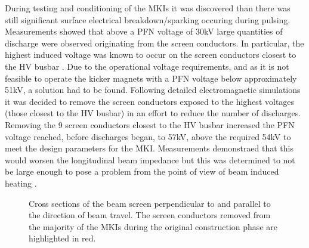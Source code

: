 During testing and conditioning of the MKIs it was discovered than there was still significant surface electrical breakdown/sparking occuring during pulsing. Measurements showed that above a PFN voltage of 30kV large quantities of discharge were observed originating from the screen conductors. In particular, the highest induced voltage was known to occur on the screen conductors closest to the HV busbar \cite{Barnes:improvBeamScreen}. Due to the operational voltage requirements, and as it is not feasible to operate the kicker magnets with a PFN voltage below approximately 51kV, a solution had to be found. Following detailed electromagnetic simulations it was decided to remove the screen conductors exposed to the highest voltages (those closest to the HV busbar) in an effort to reduce the number of discharges. Removing the 9 screen conductors closest to the HV busbar increased the PFN voltage reached, before discharges began, to 57kV, above the required 54kV to meet the design parameters for the MKI. Measurements demonstraed that this would worsen the longitudinal beam impedance but this was determined to not be large enough to pose a problem from the point of view of beam induced heating \cite{Barnes:improvBeamScreen}.

\begin{figure}
\caption{Cross sections of the beam screen perpendicular to  and parallel to  the direction of beam travel. The screen conductors removed from the majority of the MKIs during the original construction phase are highlighted in red.}
\label{fig:beamScreenCross}
\end{figure}

